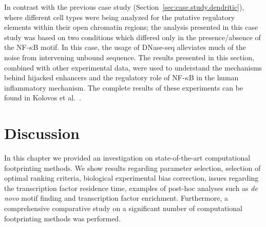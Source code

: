 In contrast with the previous case study (Section~\ref{sec:case.study.dendritic}), where different cell types were being analyzed for the putative regulatory elements within their open chromatin regions; the analysis presented in this case study was based on two conditions which differed only in the presence/absence of the NF-$\kappa$B motif. In this case, the usage of DNase-seq alleviates much of the noise from intervening unbound sequence. The results presented in this section, combined with other experimental data, were used to understand the mechanisms behind hijacked enhancers and the regulatory role of NF-$\kappa$B in the human inflammatory mechanism. The complete results of these experiments can be found in Kolovos et al.~\cite{kolovos2016}.














































\section{Discussion}
\label{sec:discussion.5}


In this chapter we provided an investigation on state-of-the-art computational footprinting methods. We show results regarding parameter selection, selection of optimal ranking criteria, biological experimental bias correction, issues regarding the transcription factor residence time, examples of post-hoc analyses such as \emph{de novo} motif finding and transcription factor enrichment. Furthermore, a comprehensive comparative study on a significant number of computational footprinting methods was performed.

